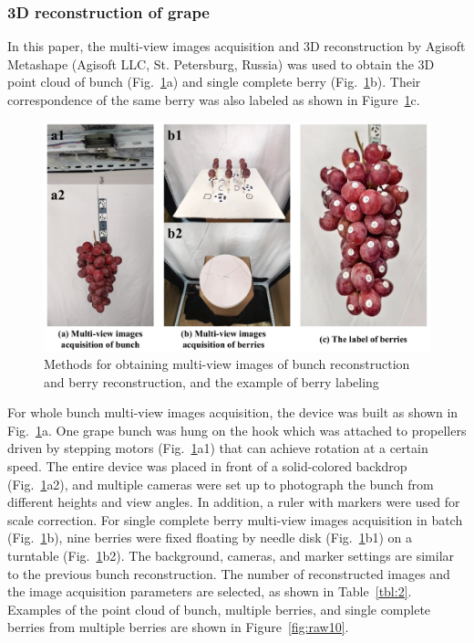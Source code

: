 \documentclass[12pt]{article}
\begin{document}
\subsubsection{3D reconstruction of grape}
\label{sec:212}

In this paper, the multi-view images acquisition and 3D reconstruction by Agisoft Metashape (Agisoft LLC, St. Petersburg, Russia) was used to obtain the 3D point cloud of bunch (Fig.~\ref{fig:raw9}a) and single complete berry (Fig.~\ref{fig:raw9}b). 
Their correspondence of the same berry was also labeled as shown in Figure~\ref{fig:raw9}c.

\begin{figure}[hbt!]
    \centering
    \includegraphics[width=1\textwidth]{figures/Figure3.pdf}
    \caption{Methods for obtaining multi-view images of bunch reconstruction and berry reconstruction, and the example of berry labeling}
    \label{fig:raw9}
\end{figure}

For whole bunch multi-view images acquisition, the device was built as shown in Fig.~\ref{fig:raw9}a. 
One grape bunch was hung on the hook which was attached to propellers driven by stepping motors (Fig.~\ref{fig:raw9}a1) that can achieve rotation at a certain speed. 
The entire device was placed in front of a solid-colored backdrop (Fig.~\ref{fig:raw9}a2), and multiple cameras were set up to photograph the bunch from different heights and view angles. 
In addition, a ruler with markers were used for scale correction. 
For single complete berry multi-view images acquisition in batch (Fig.~\ref{fig:raw9}b), 
nine berries were fixed floating by needle disk (Fig.~\ref{fig:raw9}b1) on a turntable (Fig.~\ref{fig:raw9}b2). 
The background, cameras, and marker settings are similar to the previous bunch reconstruction. 
The number of reconstructed images and the image acquisition parameters are selected, as shown in Table~\ref{tbl:2}. 
Examples of the point cloud of bunch, multiple berries, and single complete berries from multiple berries are shown in Figure~\ref{fig:raw10}.
\end{document}
